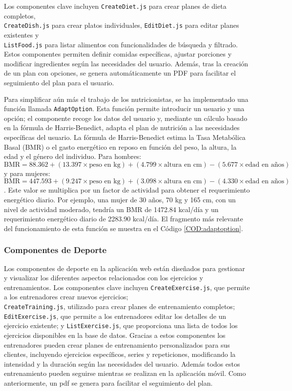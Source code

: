 Los componentes clave incluyen \texttt{CreateDiet.js} para crear planes de dieta completos, \\\texttt{CreateDish.js} para crear platos individuales, \texttt{EditDiet.js} para editar planes existentes y \\\texttt{ListFood.js} para listar alimentos con funcionalidades de búsqueda y filtrado. Estos componentes permiten definir comidas específicas, ajustar porciones y modificar ingredientes según las necesidades del usuario. Además, tras la creación de un plan con opciones, se genera automáticamente un PDF para facilitar el seguimiento del plan para el usuario.

Para simplificar aún más el trabajo de los nutricionistas, se ha implementado una función llamada \texttt{AdaptOption}. Esta función permite introducir un usuario y una opción; el componente recoge los datos del usuario y, mediante un cálculo basado en la fórmula de Harris-Benedict, adapta el plan de nutrición a las necesidades específicas del usuario. La fórmula de Harris-Benedict estima la Tasa Metabólica Basal (BMR) o el gasto energético en reposo en función del peso, la altura, la edad y el género del individuo. Para hombres: \(\text{BMR} = 88.362 + (13.397 \times \text{peso en kg}) + (4.799 \times \text{altura en cm}) - (5.677 \times \text{edad en años})\) y para mujeres: \(\text{BMR} = 447.593 + (9.247 \times \text{peso en kg}) + (3.098 \times \text{altura en cm}) - (4.330 \times \text{edad en años})\). Este valor se multiplica por un factor de actividad para obtener el requerimiento energético diario. Por ejemplo, una mujer de 30 años, 70 kg y 165 cm, con un nivel de actividad moderado, tendría un BMR de 1472.84 kcal/día y un requerimiento energético diario de 2283.90 kcal/día. El fragmento más relevante del funcionamiento de esta función se muestra en el Código \ref{COD:adaptoption}.

\subsubsection{Componentes de Deporte}
Los componentes de deporte  en la aplicación web están diseñados para gestionar y visualizar los diferentes aspectos relacionados con los ejercicios y entrenamientos. Los componentes clave incluyen \texttt{CreateExercise.js}, que permite a los entrenadores crear nuevos ejercicios; \\\texttt{CreateTraining.js}, utilizado para crear planes de entrenamiento completos; \texttt{EditExercise.js}, que permite a los entrenadores editar los detalles de un ejercicio existente; y \texttt{ListExercise.js}, que proporciona una lista de todos los ejercicios disponibles en la base de datos. Gracias a estos componentes los entrenadores pueden crear planes de entrenamiento personalizados para sus clientes, incluyendo ejercicios específicos, series y repeticiones, modificando la intensidad y la duración según las necesidades del usuario. Además todos estos entrenamiento pueden seguirse mientras se realizan en la aplicación móvil. Como anteriormente, un pdf se genera para facilitar el seguimiento del plan.

